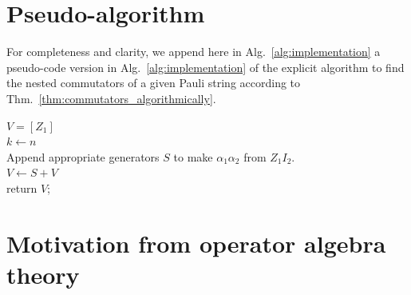 \documentclass[12pt, a4-paper]{amsart}
\numberwithin{equation}{section}
\begin{document}
\section{Pseudo-algorithm}\label{app:alg-computation}

For completeness and clarity, we append here in Alg.~\ref{alg:implementation} a pseudo-code version in Alg.~\ref{alg:implementation} of the explicit algorithm to find the nested commutators of a given Pauli string according to Thm.~\ref{thm:commutators_algorithmically}.
\begin{algorithm}[htbp]\label{alg:implementation}
\SetAlgoLined
\SetInd{0.5em}{0.5em}
\BlankLine
$V = [Z_1]$      \\
$k \gets n$ \\
Append appropriate generators $S$ to make $\alpha_1 \alpha_2$ from $Z_1 I_2$.\\
$V \gets S+V$\\
return $V$;
\caption{Explicit sequence of commutators}\label{algo:explicit_commutators}
\end{algorithm}


\section{Motivation from operator algebra theory}\label{app:operator_algebra}
\end{document}
